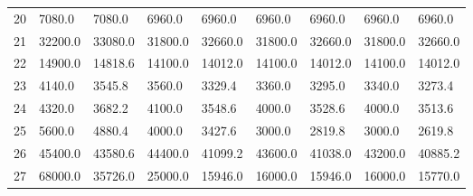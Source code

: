 \begin{tabular}{|r|l|l|l|l|l|l|l|l|}
  20 & 7080.0 & 7080.0 & 6960.0 & 6960.0 & 6960.0 & 6960.0 & 6960.0 & 6960.0 \\ 
  21 & 32200.0 & 33080.0 & 31800.0 & 32660.0 & 31800.0 & 32660.0 & 31800.0 & 32660.0 \\ 
  22 & 14900.0 & 14818.6 & 14100.0 & 14012.0 & 14100.0 & 14012.0 & 14100.0 & 14012.0 \\ 
  23 & 4140.0 & 3545.8 & 3560.0 & 3329.4 & 3360.0 & 3295.0 & 3340.0 & 3273.4 \\ 
  24 & 4320.0 & 3682.2 & 4100.0 & 3548.6 & 4000.0 & 3528.6 & 4000.0 & 3513.6 \\ 
  25 & 5600.0 & 4880.4 & 4000.0 & 3427.6 & 3000.0 & 2819.8 & 3000.0 & 2619.8 \\ 
  26 & 45400.0 & 43580.6 & 44400.0 & 41099.2 & 43600.0 & 41038.0 & 43200.0 & 40885.2 \\ 
  27 & 68000.0 & 35726.0 & 25000.0 & 15946.0 & 16000.0 & 15946.0 & 16000.0 & 15770.0 \\ 
\end{tabular}

